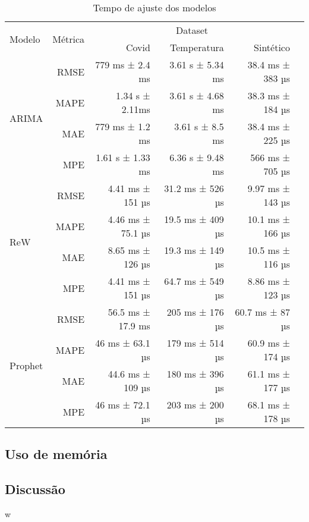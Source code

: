\begin{table}[!htp]\centering
    \caption{Tempo de ajuste dos modelos}\label{tab: }
    \scriptsize
    \begin{tabular}{lrrrrr}\toprule
    \multirow{2}{*}{Modelo} &\multirow{2}{*}{Métrica} &\multicolumn{3}{c}{Dataset} \\\cmidrule{3-5}
    & &Covid &Temperatura &Sintético \\\midrule
    \multirow{4}{*}{ARIMA} &RMSE &779 ms ± 2.4 ms &3.61 s ± 5.34 ms &38.4 ms ± 383 µs \\
    &MAPE &1.34 s ± 2.11ms &3.61 s ± 4.68 ms &38.3 ms ± 184 µs \\
    &MAE &779 ms ± 1.2 ms &3.61 s ± 8.5 ms &38.4 ms ± 225 µs \\
    &MPE &1.61 s ± 1.33 ms &6.36 s ± 9.48 ms &566 ms ± 705 µs \\\midrule
    \multirow{4}{*}{ReW} &RMSE &4.41 ms ± 151 µs &31.2 ms ± 526 µs &9.97 ms ± 143 µs \\
    &MAPE &4.46 ms ± 75.1 µs &19.5 ms ± 409 µs &10.1 ms ± 166 µs \\
    &MAE &8.65 ms ± 126 µs &19.3 ms ± 149 µs &10.5 ms ± 116 µs \\
    &MPE &4.41 ms ± 151 µs &64.7 ms ± 549 µs &8.86 ms ± 123 µs \\\midrule
    \multirow{4}{*}{Prophet} &RMSE &56.5 ms ± 17.9 ms &205 ms ± 176 µs &60.7 ms ± 87 µs \\
    &MAPE &46 ms ± 63.1 µs &179 ms ± 514 µs &60.9 ms ± 174 µs \\
    &MAE &44.6 ms ± 109 µs &180 ms ± 396 µs &61.1 ms ± 177 µs \\
    &MPE &46 ms ± 72.1 µs &203 ms ± 200 µs &68.1 ms ± 178 µs \\
    \bottomrule
    \end{tabular}
\end{table}

\subsection{Uso de memória}

\subsection{Discussão}
w